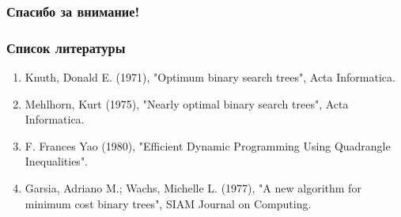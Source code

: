 \documentclass{beamer}
\begin{document}
\begin{frame}
\frametitle{Спасибо за внимание!}

\end{frame}

\begin{frame}
\frametitle{Список литературы}
\begin{enumerate}
\item  Knuth, Donald E. (1971), "Optimum binary search trees", Acta Informatica.

\item Mehlhorn, Kurt (1975), "Nearly optimal binary search trees", Acta Informatica.

\item F. Frances Yao (1980), "Efficient Dynamic Programming Using Quadrangle Inequalities".

\item Garsia, Adriano M.; Wachs, Michelle L. (1977), "A new algorithm for minimum cost binary trees", SIAM Journal on Computing.

\end{enumerate}

\end{frame}
\end{document}
